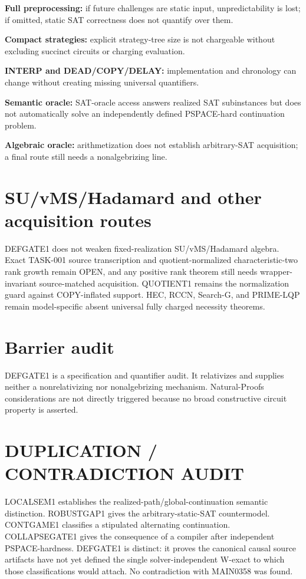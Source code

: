 \documentclass[11pt]{article}
\begin{document}
\textbf{Full preprocessing:} if future challenges are static input, unpredictability is lost; if omitted, static SAT correctness does not quantify over them.

\textbf{Compact strategies:} explicit strategy-tree size is not chargeable without excluding succinct circuits or charging evaluation.

\textbf{INTERP and DEAD/COPY/DELAY:} implementation and chronology can change without creating missing universal quantifiers.

\textbf{Semantic oracle:} SAT-oracle access answers realized SAT subinstances but does not automatically solve an independently defined PSPACE-hard continuation problem.

\textbf{Algebraic oracle:} arithmetization does not establish arbitrary-SAT acquisition; a final route still needs a nonalgebrizing line.

\section*{SU/vMS/Hadamard and other acquisition routes}
DEFGATE1 does not weaken fixed-realization SU/vMS/Hadamard algebra. Exact TASK-001 source transcription and quotient-normalized characteristic-two rank growth remain OPEN, and any positive rank theorem still needs wrapper-invariant source-matched acquisition. QUOTIENT1 remains the normalization guard against COPY-inflated support. HEC, RCCN, Search-G, and PRIME-LQP remain model-specific absent universal fully charged necessity theorems.

\section*{Barrier audit}
DEFGATE1 is a specification and quantifier audit. It relativizes and supplies neither a nonrelativizing nor nonalgebrizing mechanism. Natural-Proofs considerations are not directly triggered because no broad constructive circuit property is asserted.

\section*{DUPLICATION / CONTRADICTION AUDIT}
LOCALSEM1 establishes the realized-path/global-continuation semantic distinction. ROBUSTGAP1 gives the arbitrary-static-SAT countermodel. CONTGAME1 classifies a stipulated alternating continuation. COLLAPSEGATE1 gives the consequence of a compiler after independent PSPACE-hardness. DEFGATE1 is distinct: it proves the canonical causal source artifacts have not yet defined the single solver-independent W-exact to which those classifications would attach. No contradiction with MAIN0358 was found.
\end{document}
